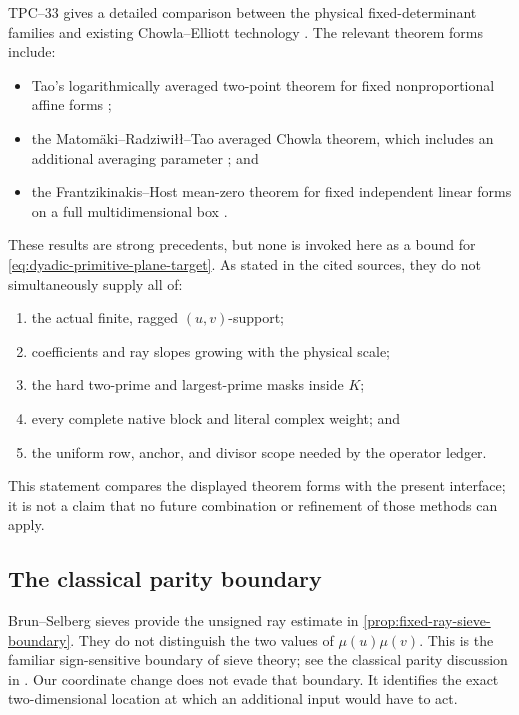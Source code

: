 TPC--33 gives a detailed comparison between the physical fixed-determinant
families and existing Chowla--Elliott technology
\citep{WangTPC33}.  The relevant theorem forms include:
\begin{itemize}
 \item Tao's logarithmically averaged two-point theorem for fixed
       nonproportional affine forms \citep{Tao2016LogChowla};
 \item the Matom\"aki--Radziwi\l\l--Tao averaged Chowla theorem, which
       includes an additional averaging parameter
       \citep{MatomakiRadziwillTao2015}; and
 \item the Frantzikinakis--Host mean-zero theorem for fixed independent
       linear forms on a full multidimensional box
       \citep{FrantzikinakisHost2017}.
\end{itemize}
These results are strong precedents, but none is invoked here as a bound
for \eqref{eq:dyadic-primitive-plane-target}.  As stated in the cited
sources, they do not simultaneously supply all of:
\begin{enumerate}[label=\textup{(\roman*)},leftmargin=3em]
 \item the actual finite, ragged \((u,v)\)-support;
 \item coefficients and ray slopes growing with the physical scale;
 \item the hard two-prime and largest-prime masks inside \(K\);
 \item every complete native block and literal complex weight; and
 \item the uniform row, anchor, and divisor scope needed by the operator
       ledger.
\end{enumerate}
This statement compares the displayed theorem forms with the present
interface; it is not a claim that no future combination or refinement of
those methods can apply.

\subsection{The classical parity boundary}

Brun--Selberg sieves provide the unsigned ray estimate in
\cref{prop:fixed-ray-sieve-boundary}.  They do not distinguish the two
values of \(\mu(u)\mu(v)\).  This is the familiar sign-sensitive boundary
of sieve theory; see the classical parity discussion in
\citep{HeathBrown1982Parity}.  Our coordinate change does not evade that
boundary.  It identifies the exact two-dimensional location at which an
additional input would have to act.

